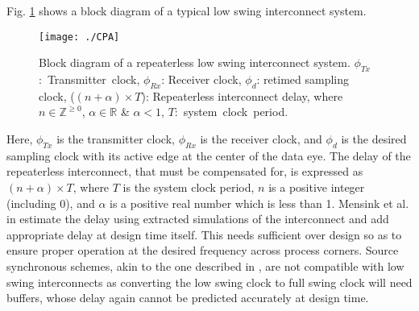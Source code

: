 \documentclass[journal,twoside,letterpaper]{IEEEtran}
\begin{document}
Fig. \ref{fig:CPA} shows a block diagram of a typical low swing interconnect system.
\begin{figure}[!h]
\centering
\texttt{[image: ./CPA]}
\caption{Block diagram of a repeaterless low
swing interconnect system. \mbox{$\phi_{Tx}$: Transmitter clock}, 
\mbox{$\phi_{Rx}$}: 
Receiver clock, \mbox{$\phi_d$}: retimed sampling clock, 
($(n+\alpha)\times T$): Repeaterless interconnect delay, where
\mbox{$n \in \mathbb{Z}^{\geq 0}$},
\mbox{$\alpha \in \mathbb{R}$} \& \mbox{$\alpha < 1$}, 
\mbox{$T$: system clock period.}}
\label{fig:CPA}
\end{figure}
Here, $\phi_{Tx}$ is the transmitter clock, $\phi_{Rx}$ is 
the receiver clock,
and $\phi_d$ is the desired sampling clock with its active edge at the center of
the data eye. The delay of the repeaterless interconnect, that must be 
compensated for, is expressed as
$(n+\alpha)\times T$, where $T$ is the system clock period, $n$ is a positive
 integer (including 0),
and $\alpha$ is a positive real number which is less than 1. 
Mensink et al. in \cite{Mensink-jssc-2010} estimate
the delay using extracted simulations of the interconnect and add
appropriate delay at design time itself. This needs sufficient over design
so as to ensure proper operation at the desired frequency across process
corners. Source synchronous schemes, akin
to the one described in \cite{vivekde-tcas-09}, are not compatible with low swing interconnects
as converting the low swing clock to full swing clock will need buffers, whose
delay again cannot be predicted accurately at design time. 
\end{document}

